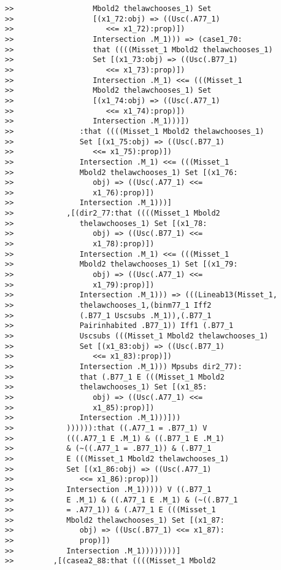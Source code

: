 \documentclass[12pt]{article}
\begin{document}
\begin{verbatim}
>>                  Mbold2 thelawchooses_1) Set
>>                  [(x1_72:obj) => ((Usc(.A77_1)
>>                     <<= x1_72):prop)])
>>                  Intersection .M_1))) => (case1_70:
>>                  that ((((Misset_1 Mbold2 thelawchooses_1)
>>                  Set [(x1_73:obj) => ((Usc(.B77_1)
>>                     <<= x1_73):prop)])
>>                  Intersection .M_1) <<= (((Misset_1
>>                  Mbold2 thelawchooses_1) Set
>>                  [(x1_74:obj) => ((Usc(.A77_1)
>>                     <<= x1_74):prop)])
>>                  Intersection .M_1)))])
>>               :that ((((Misset_1 Mbold2 thelawchooses_1)
>>               Set [(x1_75:obj) => ((Usc(.B77_1)
>>                  <<= x1_75):prop)])
>>               Intersection .M_1) <<= (((Misset_1
>>               Mbold2 thelawchooses_1) Set [(x1_76:
>>                  obj) => ((Usc(.A77_1) <<=
>>                  x1_76):prop)])
>>               Intersection .M_1)))]
>>            ,[(dir2_77:that ((((Misset_1 Mbold2
>>               thelawchooses_1) Set [(x1_78:
>>                  obj) => ((Usc(.B77_1) <<=
>>                  x1_78):prop)])
>>               Intersection .M_1) <<= (((Misset_1
>>               Mbold2 thelawchooses_1) Set [(x1_79:
>>                  obj) => ((Usc(.A77_1) <<=
>>                  x1_79):prop)])
>>               Intersection .M_1))) => (((Lineab13(Misset_1,
>>               thelawchooses_1,(binm77_1 Iff2
>>               (.B77_1 Uscsubs .M_1)),(.B77_1
>>               Pairinhabited .B77_1)) Iff1 (.B77_1
>>               Uscsubs (((Misset_1 Mbold2 thelawchooses_1)
>>               Set [(x1_83:obj) => ((Usc(.B77_1)
>>                  <<= x1_83):prop)])
>>               Intersection .M_1))) Mpsubs dir2_77):
>>               that (.B77_1 E (((Misset_1 Mbold2
>>               thelawchooses_1) Set [(x1_85:
>>                  obj) => ((Usc(.A77_1) <<=
>>                  x1_85):prop)])
>>               Intersection .M_1)))]))
>>            )))))):that ((.A77_1 = .B77_1) V
>>            (((.A77_1 E .M_1) & ((.B77_1 E .M_1)
>>            & (~((.A77_1 = .B77_1)) & (.B77_1
>>            E (((Misset_1 Mbold2 thelawchooses_1)
>>            Set [(x1_86:obj) => ((Usc(.A77_1)
>>               <<= x1_86):prop)])
>>            Intersection .M_1))))) V ((.B77_1
>>            E .M_1) & ((.A77_1 E .M_1) & (~((.B77_1
>>            = .A77_1)) & (.A77_1 E (((Misset_1
>>            Mbold2 thelawchooses_1) Set [(x1_87:
>>               obj) => ((Usc(.B77_1) <<= x1_87):
>>               prop)])
>>            Intersection .M_1))))))))]
>>         ,[(casea2_88:that ((((Misset_1 Mbold2

\end{verbatim}
\end{document}
